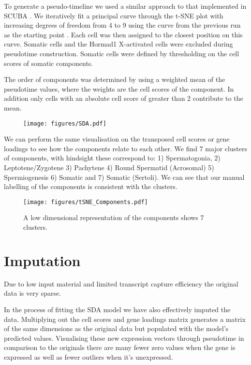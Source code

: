 To generate a pseudo-timeline we used a similar approach to that implemented in SCUBA \cite{Marco2014-ky}. We iteratively fit a principal curve through the t-SNE plot with increasing degrees of freedom from 4 to 9 using the curve from the previous run as the starting point \cite{Hastie1989-ej}. Each cell was then assigned to the closest position on this curve. Somatic cells and the Hormad1 X-activated cells were excluded during pseudotime construction. Somatic cells were defined by thresholding on the cell scores of somatic components.

The order of components was determined by using a weighted mean of the pseudotime values, where the weights are the cell scores of the component. In addition only cells with an absolute cell score of greater than 2 contribute to the mean.

\begin{figure}[H]
	\centering
	\texttt{[image: figures/SDA.pdf]}
	\caption{}
	\label{fig:SDA}
\end{figure}

We can perform the same visualisation on the transposed cell scores or gene loadings to see how the components relate to each other. We find 7 major clusters of components, with hindsight these correspond to: 1) Spermatogonia, 2) Leptotene/Zygotene 3) Pachytene 4) Round Spermatid (Acrosomal) 5) Spermiogenesis 6) Somatic and 7) Somatic (Sertoli). We can see that our manual labelling of the components is consistent with the clusters.

\begin{figure}[H]
	\centering
	\texttt{[image: figures/tSNE\_Components.pdf]}
	\caption{A low dimensional representation of the components shows 7 clusters.}
	\label{fig:tSNE_Components}
\end{figure}



\section{Imputation}

Due to low input material and limited transcript capture efficiency the original data is very sparse. 

In the process of fitting the SDA model we have also effectively imputed the data. Multiplying out the cell scores and gene loadings matrix generates a matrix of the same dimensions as the original data but populated with the model's predicted values. Visualising these new expression vectors through pseudotime in comparison to the originals there are many fewer zero values when the gene is expressed as well as fewer outliers when it's unexpressed.

